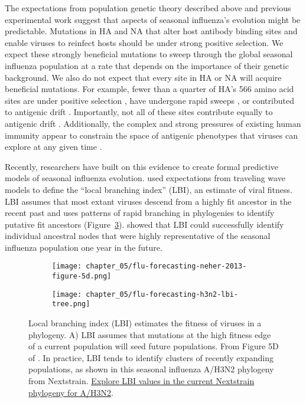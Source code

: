 The expectations from population genetic theory described above and previous experimental work suggest that aspects of seasonal influenza's evolution might be predictable.
Mutations in HA and NA that alter host antibody binding sites and enable viruses to reinfect hosts should be under strong positive selection.
We expect these strongly beneficial mutations to sweep through the global seasonal influenza population at a rate that depends on the importance of their genetic background.
We also do not expect that every site in HA or NA will acquire beneficial mutations.
For example, fewer than a quarter of HA's 566 amino acid sites are under positive selection \citep{Bush:1999vj}, have undergone rapid sweeps \citep{Shih:2007bd}, or contributed to antigenic drift \citep{Wolf:2006da}.
Importantly, not all of these sites contribute equally to antigenic drift \citep{Koel:2013jz}.
Additionally, the complex and strong pressures of existing human immunity appear to constrain the space of antigenic phenotypes that viruses can explore at any given time \citep{Smith:2004jc,Bedford2012}.

Recently, researchers have built on this evidence to create formal predictive models of seasonal influenza evolution.
\citet{Neher:2014eu} used expectations from traveling wave models to define the ``local branching index'' (LBI), an estimate of viral fitness.
LBI assumes that most extant viruses descend from a highly fit ancestor in the recent past and uses patterns of rapid branching in phylogenies to identify putative fit ancestors (Figure~\ref{fig:lbi}).
\citet{Neher:2014eu} showed that LBI could successfully identify individual ancestral nodes that were highly representative of the seasonal influenza population one year in the future.

\begin{figure}
  \centering
  \begin{subfigure}[b]{0.5\columnwidth}
    \centering
    \texttt{[image: chapter\_05/flu-forecasting-neher-2013-figure-5d.png]}
    \label{fig:lbi-theory}
  \end{subfigure}

  \begin{subfigure}[b]{0.65\columnwidth}
    \centering
    \texttt{[image: chapter\_05/flu-forecasting-h3n2-lbi-tree.png]}
    \label{fig:lbi-practice}
  \end{subfigure}

  \caption{Local branching index (LBI) estimates the fitness of viruses in a phylogeny.
    A) LBI assumes that mutations at the high fitness edge of a current population will seed future populations.
    From Figure 5D of \citet{Neher2013}.
    In practice, LBI tends to identify clusters of recently expanding populations, as shown in this seasonal influenza A/H3N2 phylogeny from Nextstrain.
    \href{https://nextstrain.org/flu/seasonal/h3n2/ha/2y?c=lbi}{Explore LBI values in the current Nextstrain phylogeny for A/H3N2}.
  }
  \label{fig:lbi}
\end{figure}

